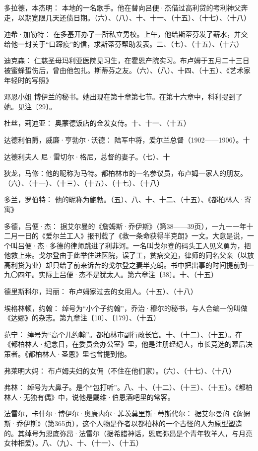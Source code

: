 \par 多拉德，本杰明： 本地的一名歌手。他在替向吕便·杰借过高利贷的考利神父奔走，以期宽限几天还债日期。（六）、（八）、十、十一、（十五）、（十七）、（十八）
\par 迪希·加勒特： 在多基开办了一所私立男校。上午，他给斯蒂芬发了薪水，并交给他一封关于“口蹄疫”的信，求斯蒂芬帮助发表。二、（七）、（十五）、（十六）
\par 迪克森： 仁慈圣母玛利亚医院见习生，在霍恩产院实习。布卢姆于五月二十三日被蜜蜂蜇伤后，曾由他包扎。斯蒂芬之友。（六）、（八）、十四、（十五）、《艺术家年轻时的写照》
\par 邓恩小姐 博伊兰的秘书。她出现在第十章第七节。在第十六章中，科利提到了她。见注〔29〕。
\par 杜丝，莉迪亚： 奥蒙德饭店的金发女侍。十、十一、（十五）
\par 达德利伯爵，威廉·亨勃尔·沃德： 陆军中将，爱尔兰总督（1902——1906）。十
\par 达德利夫人 尼·雷切尔·格尼，总督的妻子。（七）、十
\par 狄龙，马修：他的昵称为马特。都柏林市的一名参议员，布卢姆一家人的朋友。（六）、（十一）、（十三）、（十五）、（十七）、（十八）
\par 多兰，罗伯特： 他的昵称为鲍勃。（五）、八、十、十二、（十五）、《都柏林人·寄寓》
\par 多德，吕便·杰： 据艾尔曼的《詹姆斯·乔伊斯》（第38——39页），一九一一年十二月一日的《爱尔兰工人》报刊载了《救一条命获得半克朗》一文。大意是说，一个叫吕便·杰·多德的律师跳进了利菲河。一名叫戈尔登的码头工人见义勇为，把他救上来。戈尔登由于此举住进医院，误了工，贫病交迫，律师的同名父亲（以放高利贷为业）却只给了前来诉苦的戈尔登之妻半克朗。书中把出事的时间提前到一九〇四年。实际上吕便·杰不是犹太人。第六章注〔38〕。十、（十五）
\par 德里斯科尔，玛丽： 布卢姆家过去的女用人。（十五）、（十八）
\par 埃格林顿，约翰： 绰号为“小个子约翰”，乔治·穆尔的秘书，与人合编一份叫做《达娜》的杂志。第九章注〔10〕、〔179〕、（十五）
\par 范宁： 绰号为“高个儿约翰”。都柏林市副行政长官。十、（十二）、（十五）。在《都柏林人·纪念日，在委员会办公室》里，他是注册经纪人，市长竞选的幕后决策者。《都柏林人·圣恩》里也曾提到他。
\par 弗莱明大妈： 布卢姆夫妇的女佣（不住在他们家）。（六）、（十七）、（十八）
\par 弗林： 绰号为大鼻子。是个“包打听”。八、十、（十二）、（十三）、（十五）。《都柏林人·无独有偶》中，说他是戴维·伯恩酒吧里的常客。
\par 法雷尔，卡什尔·博伊尔·奥康内尔·菲茨莫里斯·蒂斯代尔： 据艾尔曼的《詹姆斯·乔伊斯》（第365页），这个人物是作者以都柏林的一个古怪的人为原型塑造的。其绰号为恩底弥昂·法雷尔（据希腊神话，恩底弥昂是个青年牧羊人，与月亮女神相爱）。八、（九）、十、（十一）、（十五）

